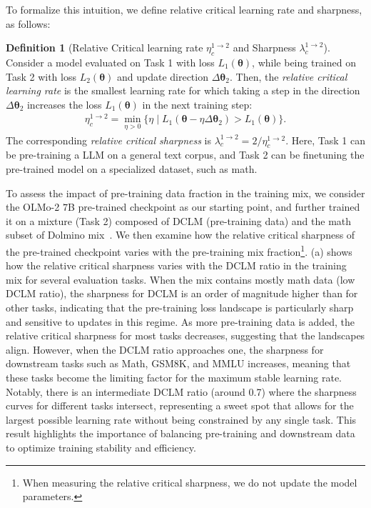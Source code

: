 \documentclass[]{fairmeta}
\theoremstyle{plain}
\theoremstyle{definition}
\newtheorem{definition}{Definition}[section]
\begin{document}
To formalize this intuition, we define relative critical learning rate and sharpness, as follows:
\begin{definition}[Relative Critical learning rate $\eta_c^{1 \to 2}$ and Sharpness $\lambda_c^{1 \to 2}$]
\label{def:relative-critical-lr-sharpness}   
Consider a model evaluated on Task 1 with loss $L_1(\bm{\theta})$, while being trained on Task 2 with loss $L_2(\bm{\theta})$ and update direction $\Delta \bm{\theta}_2$. Then, the \emph{relative critical learning rate} is the smallest learning rate for which taking a step in the direction $\Delta \bm{\theta}_2$ increases the loss $L_1(\bm{\theta})$ in the next training step:
\begin{align}
    \eta_c^{1\to2} = \min_{\eta > 0} \{ \eta \mid L_1(\bm{\theta} - \eta \Delta \bm{\theta}_2 ) >  L_1(\bm{\theta})  \}.
\end{align}
The corresponding \emph{relative critical sharpness} is $\lambda_c^{1\to2} = 2 / \eta_c^{1\to2}$.
Here, Task 1 can be pre-training a LLM on a general text corpus, and Task 2 can be finetuning the pre-trained model on a specialized dataset, such as math. 
 
\end{definition}

To assess the impact of pre-training data fraction in the training mix, we consider the OLMo-2 $7$B pre-trained checkpoint as our starting point, and further trained it on a mixture (Task 2) composed of DCLM (pre-training data) and the math subset of Dolmino mix~\citep{walsh2025}. We then examine how the relative critical sharpness of the pre-trained checkpoint varies with the pre-training mix fraction\footnote{When measuring the relative critical sharpness, we do not update the model parameters.}. 
(a) shows how the relative critical sharpness varies with the DCLM ratio in the training mix for several evaluation tasks. When the mix contains mostly math data (low DCLM ratio), the sharpness for DCLM is an order of magnitude higher than for other tasks, indicating that the pre-training loss landscape is particularly sharp and sensitive to updates in this regime. As more pre-training data is added, the relative critical sharpness for most tasks decreases, suggesting that the landscapes align. However, when the DCLM ratio approaches one, the sharpness for downstream tasks such as Math, GSM8K, and MMLU increases, meaning that these tasks become the limiting factor for the maximum stable learning rate. Notably, there is an intermediate DCLM ratio (around 0.7) where the sharpness curves for different tasks intersect, representing a sweet spot that allows for the largest possible learning rate without being constrained by any single task. This result highlights the importance of balancing pre-training and downstream data to optimize training stability and efficiency.
\end{document}

